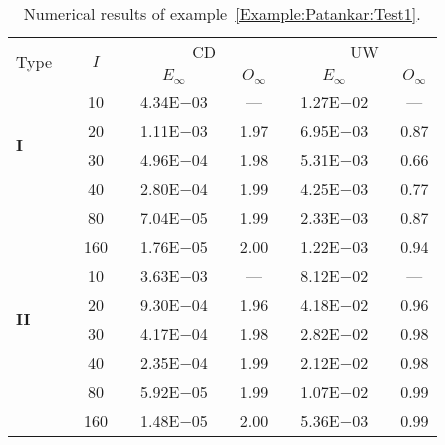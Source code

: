 {\renewcommand{\baselinestretch}{1.0}
\begin{table}[H]
\caption{Numerical results of example~\ref{Example:Patankar:Test1}.}

\setlength{\tabcolsep}{5pt}
\centering
\begin{tabular}{@{}l c c c c c c c c c c@{}}
\toprule
\multirow{2}{*}{Type} &  & \multirow{2}{*}{$I$} &  & \multicolumn{3}{c}{CD} &  & \multicolumn{3}{c}{UW} \\
\cline{5-7}
\cline{9-11}
 & & & & $E_{\infty}$ & & $O_{\infty}$ & & $E_{\infty}$ & & $O_{\infty}$\\
\midrule
\multirow{4}{*}{\textbf{I}} 
 & & 10 & & 4.34E$-$03 & & --- & & 1.27E$-$02 & & ---\\
 & & 20 & & 1.11E$-$03 & & 1.97 & & 6.95E$-$03 & & 0.87\\
 & & 30 & & 4.96E$-$04 & & 1.98 & & 5.31E$-$03 & & 0.66\\
 & & 40 & & 2.80E$-$04 & & 1.99 & & 4.25E$-$03 & & 0.77\\
 & & 80 & & 7.04E$-$05 & & 1.99 & & 2.33E$-$03 & & 0.87\\
 & & 160 & & 1.76E$-$05 & & 2.00 & & 1.22E$-$03 & & 0.94\\
\midrule
\multirow{4}{*}{\textbf{II}} 
 & & 10 & & 3.63E$-$03 & & --- & & 8.12E$-$02 & & ---\\
 & & 20 & & 9.30E$-$04 & & 1.96 & & 4.18E$-$02 & & 0.96\\
 & & 30 & & 4.17E$-$04 & & 1.98 & & 2.82E$-$02 & & 0.98\\
 & & 40 & & 2.35E$-$04 & & 1.99 & & 2.12E$-$02 & & 0.98\\
 & & 80 & & 5.92E$-$05 & & 1.99 & & 1.07E$-$02 & & 0.99\\
 & & 160 & & 1.48E$-$05 & & 2.00 & & 5.36E$-$03 & & 0.99\\
\bottomrule
\end{tabular}
\label{Table:Patankar:Test1}
\end{table}}
